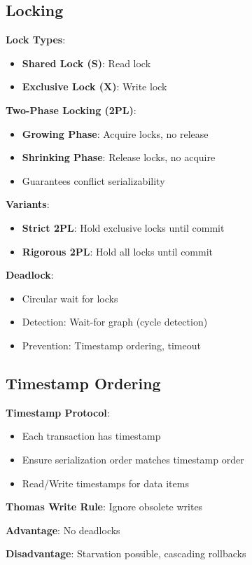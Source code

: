 \documentclass[12pt,a4paper]{report}
\begin{document}
\subsection{Locking}
\begin{concept}
\textbf{Lock Types}:
\begin{itemize}
    \item \textbf{Shared Lock (S)}: Read lock
    \item \textbf{Exclusive Lock (X)}: Write lock
\end{itemize}

\textbf{Two-Phase Locking (2PL)}:
\begin{itemize}
    \item \textbf{Growing Phase}: Acquire locks, no release
    \item \textbf{Shrinking Phase}: Release locks, no acquire
    \item Guarantees conflict serializability
\end{itemize}

\textbf{Variants}:
\begin{itemize}
    \item \textbf{Strict 2PL}: Hold exclusive locks until commit
    \item \textbf{Rigorous 2PL}: Hold all locks until commit
\end{itemize}

\textbf{Deadlock}:
\begin{itemize}
    \item Circular wait for locks
    \item Detection: Wait-for graph (cycle detection)
    \item Prevention: Timestamp ordering, timeout
\end{itemize}
\end{concept}

\subsection{Timestamp Ordering}
\begin{concept}
\textbf{Timestamp Protocol}:
\begin{itemize}
    \item Each transaction has timestamp
    \item Ensure serialization order matches timestamp order
    \item Read/Write timestamps for data items
\end{itemize}

\textbf{Thomas Write Rule}: Ignore obsolete writes

\textbf{Advantage}: No deadlocks

\textbf{Disadvantage}: Starvation possible, cascading rollbacks
\end{concept}
\end{document}
